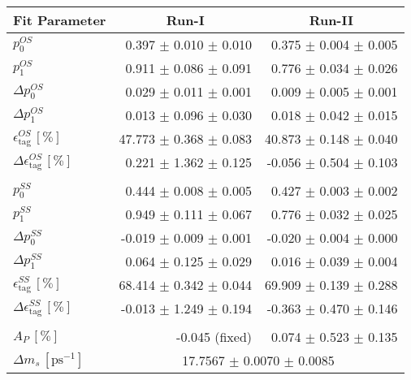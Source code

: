 \begin{tabular}{l r r } 
\hline
\hline
\multicolumn{1}{c}{Fit Parameter} & \multicolumn{1}{c}{Run-I} & \multicolumn{1}{c}{Run-II}  \\ 
\hline
$p_{0}^{OS}$ & 0.397 $\pm$ 0.010 $\pm$ 0.010 & 0.375 $\pm$ 0.004 $\pm$ 0.005 \\ 
$p_{1}^{OS}$ & 0.911 $\pm$ 0.086 $\pm$ 0.091 & 0.776 $\pm$ 0.034 $\pm$ 0.026 \\ 
$\Delta p_{0}^{OS}$ & 0.029 $\pm$ 0.011 $\pm$ 0.001 & 0.009 $\pm$ 0.005 $\pm$ 0.001 \\ 
$\Delta p_{1}^{OS}$ & 0.013 $\pm$ 0.096 $\pm$ 0.030 & 0.018 $\pm$ 0.042 $\pm$ 0.015 \\ 
$\epsilon_{\text{tag}}^{OS} \, [\%]$ & 47.773 $\pm$ 0.368 $\pm$ 0.083 & 40.873 $\pm$ 0.148 $\pm$ 0.040 \\ 
$\Delta \epsilon_{\text{tag}}^{OS} \, [\%]$ & 0.221 $\pm$ 1.362 $\pm$ 0.125 & -0.056 $\pm$ 0.504 $\pm$ 0.103 \\ 
 \\ 
$p_{0}^{SS}$ & 0.444 $\pm$ 0.008 $\pm$ 0.005 & 0.427 $\pm$ 0.003 $\pm$ 0.002 \\ 
$p_{1}^{SS}$ & 0.949 $\pm$ 0.111 $\pm$ 0.067 & 0.776 $\pm$ 0.032 $\pm$ 0.025 \\ 
$\Delta p_{0}^{SS}$ & -0.019 $\pm$ 0.009 $\pm$ 0.001 & -0.020 $\pm$ 0.004 $\pm$ 0.000 \\ 
$\Delta p_{1}^{SS}$ & 0.064 $\pm$ 0.125 $\pm$ 0.029 & 0.016 $\pm$ 0.039 $\pm$ 0.004 \\ 
$\epsilon_{\text{tag}}^{SS} \, [\%]$ & 68.414 $\pm$ 0.342 $\pm$ 0.044 & 69.909 $\pm$ 0.139 $\pm$ 0.288 \\ 
$\Delta \epsilon_{\text{tag}}^{SS} \, [\%]$ & -0.013 $\pm$ 1.249 $\pm$ 0.194 & -0.363 $\pm$ 0.470 $\pm$ 0.146 \\ 
 \\ 
$A_{P} \, [\%]$ & -0.045 (fixed) & 0.074 $\pm$ 0.523 $\pm$ 0.135 \\ 
\hline
$\Delta m_{s} \, [\text{ps}^{-1}]$ & \multicolumn{2}{c}{ 17.7567 $\pm$ 0.0070 $\pm$ 0.0085 }  \\ 
\hline
\hline
\end{tabular}
